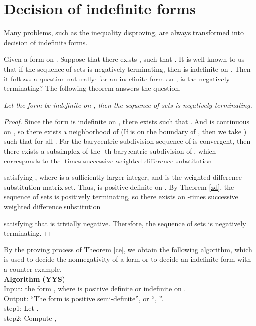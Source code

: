 \documentclass [10pt,a4paper]{article}
\begin{document}
\section{Decision of indef\mbox{}inite forms}

Many problems,  such  as the inequality disproving, are always
transformed into decision of indef\mbox{}inite forms.

 Given a form
 on . Suppose that there exists , such that . It is well-known to us that if
the sequence of sets  is
negatively terminating, then   is indef\mbox{}inite on
. Then it follows a question naturally: for an
indef\mbox{}inite form  on , is the
 negatively terminating? The
following theorem answers the question.

\begin{theorem} \label{ce}
\emph{Let the form  be indef\mbox{}inite on ,  then
the sequence of sets  is
negatively terminating.}
\end{theorem}

\begin{proof}  Since the form  is indef\mbox{}inite on
   ,  there exists  such that  .  And  is continuous on
,  so there exists a neighborhood
 of  (If  is on the
boundary of , then we take ) such that   for all .
For the  barycentric subdivision
 sequence of  is
convergent, then there exists a subsimplex   of the -th
barycentric subdivision of , which corresponds to the
-times successive weighted dif\mbox{}ference substitution

 
 satisfying , where  is a  suf\mbox{}f\mbox{}iciently
larger integer, and  is the weighted dif\mbox{}ference
 substitution matrix set.  Thus,  is positive definite on
 . By Theorem  \ref{zd},
the sequence of  sets  is
positively terminating, so there exists an
 -times successive
weighted dif\mbox{}ference substitution
 
 satisfying that 
 is trivially negative. Therefore, the sequence of sets  is
negatively terminating.\end{proof}






By the proving process of Theorem \ref{ce},  we obtain the following
algorithm,  which is used to decide the  nonnegativity of a form or
to decide an indef\mbox{}inite form with a
counter-example.\\
\textbf{Algorithm} \textbf{(YYS)}\\
Input: the form  , where   is positive def\mbox{}inite or indef\mbox{}inite on  .  \\
Output:  ``The form  is positive semi-def\mbox{}inite'', or ``, ''.\\
step1: Let  .\\
step2:  Compute ,
\end{document}
